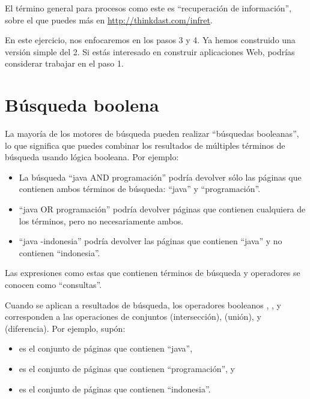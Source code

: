 \documentclass[12pt]{book}
\theoremstyle{exercise}
\begin{document}
El término general para procesos como este es ``recuperación de información'',
sobre el que puedes más en
\url{http://thinkdast.com/infret}.

En este ejercicio, nos enfocaremos en los pasos 3 y 4. Ya hemos construido una
versión simple del 2. Si estás interesado en construir aplicaciones Web,
podrías considerar trabajar en el paso 1.


\section{Búsqueda boolena}
\label{boolean-search}


La mayoría de los motores de búsqueda pueden realizar ``búsquedas booleanas'',
lo que significa que puedes combinar los resultados de múltiples términos de
búsqueda usando lógica booleana. Por ejemplo:

\begin{itemize}

\item
  La búsqueda ``java AND programación'' podría devolver sólo las páginas que
  contienen ambos términos de búsqueda: ``java'' y ``programación''.

\item
  ``java OR programación'' podría devolver páginas que contienen cualquiera de
  los términos, pero no necesariamente ambos.

\item
  ``java -indonesia'' podría devolver las páginas que contienen ``java'' y no
  contienen ``indonesia''.

\end{itemize}

Las expresiones como estas que contienen términos de búsqueda y operadores se
conocen como ``consultas''.


Cuando se aplican a resultados de búsqueda, los operadores booleanos
, , y \java{-} corresponden a las operaciones de
conjuntos  (intersección),  (unión), 
y  (diferencia). Por ejemplo, supón:

\begin{itemize}

\item
   es el conjunto de páginas que contienen ``java'',

\item
   es el conjunto de páginas que contienen ``programación'', y

\item
   es el conjunto de páginas que contienen ``indonesia''.

\end{itemize}
\end{document}
